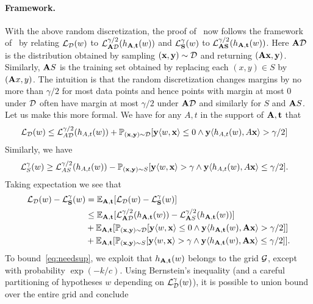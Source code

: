 \paragraph{Framework.}
With the above random discretization, the proof of~\cite{SVMbest} now follows the framework of~\cite{SFBL98} by relating $\mathcal{L}_{\mathcal{D}}(w)$ to $\mathcal{L}^{\gamma/2}_{\mathbf{A}\mathcal{D}}(h_{\mathbf{A},\mathbf{t}}(w))$ and $\mathcal{L}^\gamma_{\mathbf{S}}(w)$ to $\mathcal{L}^{\gamma/2}_{\mathbf{A} \mathbf{S}}(h_{\mathbf{A},\mathbf{t}}(w))$. Here $\mathbf{A} \mathcal{D}$ is the distribution obtained by sampling $(\mathbf{x},\mathbf{y}) \sim \mathcal{D}$ and returning $(\mathbf{A} \mathbf{x}, \mathbf{y})$. Similarly, $\mathbf{A} S$ is the training set obtained by replacing each $(x,y) \in S$ by $(\mathbf{A} x, y)$. The intuition is that the random discretization changes margins by no more than $\gamma/2$ for most data points and hence points with margin at most $0$ under $\mathcal{D}$ often have margin at most $\gamma/2$ under $\mathbf{A} \mathcal{D}$ and similarly for $S$ and $\mathbf{A} S$. Let us make this more formal. We have for any $A,t$ in the support of $\mathbf{A},\mathbf{t}$ that
\begin{align}
\mathcal{L}_{\mathcal{D}}(w) &\leq \mathcal{L}^{\gamma/2}_{A \mathcal{D}}(h_{A,t}(w)) + \mathbb{P}_{(\mathbf{x},\mathbf{y}) \sim \mathcal{D}}[\mathbf{y} \langle w, \mathbf{x}\rangle \leq 0 \wedge \mathbf{y} \langle h_{A,t}(w) , A\mathbf{x}\rangle > \gamma/2] \label{eq:Dupper}
\end{align}
Similarly, we have
\begin{align}
\mathcal{L}^\gamma_S(w) &\geq \mathcal{L}^{\gamma/2}_{A S}(h_{A,t}(w)) - \mathbb{P}_{(\mathbf{x},\mathbf{y}) \sim S}[\mathbf{y} \langle w, \mathbf{x}\rangle > \gamma \wedge \mathbf{y} \langle h_{A,t}(w) , A\mathbf{x}\rangle \leq \gamma/2].\label{eq:Supper}
\end{align}
Taking expectation we see that
\begin{align}
    \mathcal{L}_{\mathcal{D}}(w) - \mathcal{L}_{\mathbf{S}}^\gamma(w) &= \mathbb{E}_{\mathbf{A},\mathbf{t}}[\mathcal{L}_{\mathcal{D}}(w) - \mathcal{L}_{\mathbf{S}}^\gamma(w)] \nonumber\\
    &\leq \mathbb{E}_{\mathbf{A},\mathbf{t}}[\mathcal{L}^{\gamma/2}_{\mathbf{A} \mathcal{D}}(h_{\mathbf{A},\mathbf{t}}(w)) -\mathcal{L}^{\gamma/2}_{\mathbf{A} S}(h_{\mathbf{A},\mathbf{t}}(w)) ] \label{eq:needsup}\\
    &+ \mathbb{E}_{\mathbf{A},\mathbf{t}}[\mathbb{P}_{(\mathbf{x},\mathbf{y}) \sim \mathcal{D}}[\mathbf{y} \langle w, \mathbf{x}\rangle \leq 0 \wedge \mathbf{y} \langle h_{\mathbf{A},\mathbf{t}}(w) , \mathbf{A} \mathbf{x}\rangle > \gamma/2]]\label{eq:dRel}\\
    &+ \mathbb{E}_{\mathbf{A},\mathbf{t}}[\mathbb{P}_{(\mathbf{x},\mathbf{y}) \sim S}[\mathbf{y} \langle w, \mathbf{x}\rangle > \gamma \wedge \mathbf{y} \langle h_{\mathbf{A},\mathbf{t}}(w) , \mathbf{A} \mathbf{x}\rangle \leq \gamma/2]]\label{eq:sRel}.
\end{align}
To bound~\eqref{eq:needsup}, we exploit that $h_{\mathbf{A},\mathbf{t}}(w)$ belongs to the grid $\mathcal{G}$, except with probability $\exp(- k/c)$. Using Bernstein's inequality (and a careful partitioning of hypotheses $w$ depending on $\mathcal{L}_{\mathcal{D}}^\gamma(w)$), it is possible to union bound over the entire grid and conclude
